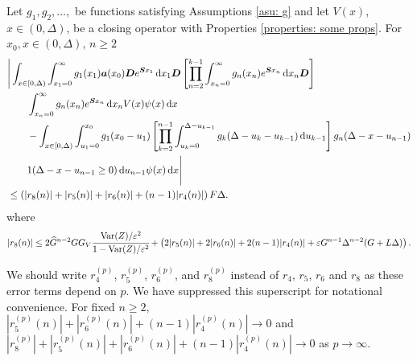 \begin{cor}\label{cor: fljm7778}
	Let \(g_1,g_2,\dots,\) be functions satisfying Assumptions \ref{asu: g} and let \(V(x)\), \(x\in(0,\Delta)\), be a closing operator with Properties \ref{properties: some props}. For \(x_0,x\in(0,\Delta)\), \(n\geq 2\)
	\begin{align}
		&\Bigg| \int_{x\in[0,\Delta)} \int_{x_1=0}^\infty g_1(x_1) \boldsymbol a (x_0) \boldsymbol D e^{\boldsymbol{S}x_1}\, \mathrm{d} x_1\boldsymbol D 
            	\left[\prod_{n=2}^{k-1}\int_{x_n=0}^\infty g_n(x_n) e^{\boldsymbol{S}x_n} \, \mathrm{d} x_n
		\boldsymbol D\right]\nonumber 
            	\\&\qquad{}\int_{x_n=0}^\infty g_{n}(x_n) e^{\boldsymbol{S}x_n} \, \mathrm{d} x_n V(x) \psi(x)\, \mathrm{d} x \nonumber 
		\\&\qquad {}- \int_{x\in[0,\Delta)} \int_{u_1=0}^{x_0}g_1(x_0 - u_1)
		\left[\prod_{k=2}^{n-1} \int_{u_k=0}^{\Delta-u_{k-1}} g_k(\Delta-u_k-u_{k-1})\, \mathrm{d} u_{k-1}\right] \nonumber 
            	g_{n}(\Delta - x-u_{n-1})
	\\&\qquad{} 1(\Delta-x-u_{n-1}\geq0)\, \mathrm{d} u_{n-1}\psi(x)\, \mathrm{d} x \Bigg| \nonumber
		\\&\leq \left(|r_8(n)|+|r_5(n)|+|r_6(n)| + (n-1)|r_4(n)|\right)F\Delta.\label{eqn: KAFnnmna}
	\end{align}
	where 
	\[|r_8(n)|\leq 2\widehat G^{n-2}GG_V\cfrac{\mathrm{Var}(Z)/\varepsilon^2}{1-\mathrm{Var}(Z)/\varepsilon^2}
		+ \left( 2|r_5(n)| + 2|r_6(n)| + 2(n-1)|r_4(n)| + \varepsilon G^{n-1}\Delta^{n-2}(G+L\Delta) \right) .\]
\end{cor}
We should write \(r_4^{(p)}\), \(r_5^{(p)}\), \(r_6^{(p)}\), and \(r_8^{(p)}\) instead of \(r_4\), \(r_5\), \(r_6\) and \(r_8\) as these error terms depend on \(p\). We have suppressed this superscript for notational convenience. For fixed \(n\geq 2\), \( |r_5^{(p)}(n)| + |r_6^{(p)}(n)| + (n-1)|r_4^{(p)}(n)|\to 0\) and \( |r_8^{(p)}|+|r_5^{(p)}(n)| + |r_6^{(p)}(n)| + (n-1)|r_4^{(p)}(n)|\to 0\) as \(p\to \infty\). 

